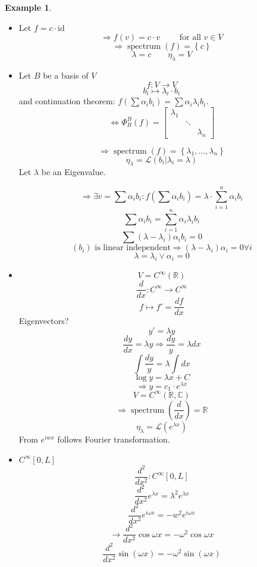 \documentclass[a4paper,landscape,twocolumn]{article}
\newcommand\set[1]{\left\{#1\right\}}
\theoremstyle{definition}
\newtheorem{ex}{Example}
\DeclareMathOperator\spec{spectrum}
\begin{document}
\begin{ex}
  \label{bsp-10.3}
  \begin{itemize}
    \item Let $f = c \cdot \text{id}$
      \[ \Rightarrow f(v) = c \cdot v \qquad \text{ for all } v \in V \]
      \[ \Rightarrow \spec(f) = \set{c} \]
      \[ \lambda = c \qquad \eta_\lambda = V \]
    \item
      Let $B$ be a basis of $V$
      \[ f: V \to V \]
      \[ b_i \mapsto \lambda_i \cdot b_i \]
      and continuation theorem: $f(\sum \alpha_i b_i) = \sum \alpha_i \lambda_i b_i$.
      \[
        \Leftrightarrow \Phi_B^B(f) = \begin{bmatrix}
          \lambda_1 &        & \\
                    & \ddots & \\
                    &        & \lambda_n
        \end{bmatrix}
      \]

      \[ \Rightarrow \spec(f) = \set{\lambda_1, \ldots, \lambda_n} \]
      \[ \eta_\lambda = \mathcal L\left(b_i \left| \lambda_i = \lambda\right)\right. \]
      Let $\lambda$ be an Eigenvalue.

      \[
        \Rightarrow \exists v = \sum \alpha_i b_i:
        f\left(\sum \alpha_i b_i\right) = \lambda \cdot \sum_{i=1}^n \alpha_i b_i
      \] \[
        \sum \alpha_i b_i = \sum_{i=1}^n \alpha_i \lambda_i b_i
      \] \[
        \sum (\lambda - \lambda_i) \alpha_i b_i = 0
      \] \[
        (b_i) \text{ is linear independent} \Rightarrow (\lambda - \lambda_i) \alpha_i = 0 \forall i
      \] \[
        \lambda = \lambda_i \lor \alpha_i = 0
      \]
    \item
      \[ V = C^{\infty}(\mathbb R) \]
      \[ \frac{d}{dx}: C^{\infty} \to C^{\infty} \]
      \[ f \mapsto f' = \frac{df}{dx} \]
      Eigenvectors?
      \[ y' = \lambda y \]
      \[ \frac{dy}{dx} = \lambda y \Rightarrow \frac{dy}{y} = \lambda dx \]
      \[ \int \frac{dy}{y} = \lambda \int dx \]
      \[ \log{y} = \lambda x + C \]
      \[ \Rightarrow y = c_1 \cdot e^{\lambda x} \]
      \[ V = C^{\infty}(\mathbb R, \mathbb C) \]
      \[ \Rightarrow \spec\left(\frac{d}{dx}\right) = \mathbb R \]
      \[ \eta_\lambda = \mathcal L(e^{\lambda x}) \]
      From $e^{iwx}$ follows Fourier transformation.
    \item
      $C^\infty [0, L]$
      \[ \frac{d^2}{dx^2}: C^\infty [0,L] \]
      \[ \frac{d^2}{dx^2} e^{\lambda x} = \lambda^2 e^{\lambda x} \]
      \[ \frac{d^2}{dx^2} e^{i\omega x} = -w^2 e^{i\omega x} \]
      \[ \rightarrow \frac{d^2}{dx^2} \cos{\omega x} = -\omega^2 \cos{\omega x} \]
      \[ \frac{d^2}{dx^2} \sin(\omega x) = -\omega^2 \sin(\omega x) \]
  \end{itemize}
\end{ex}
\end{document}
